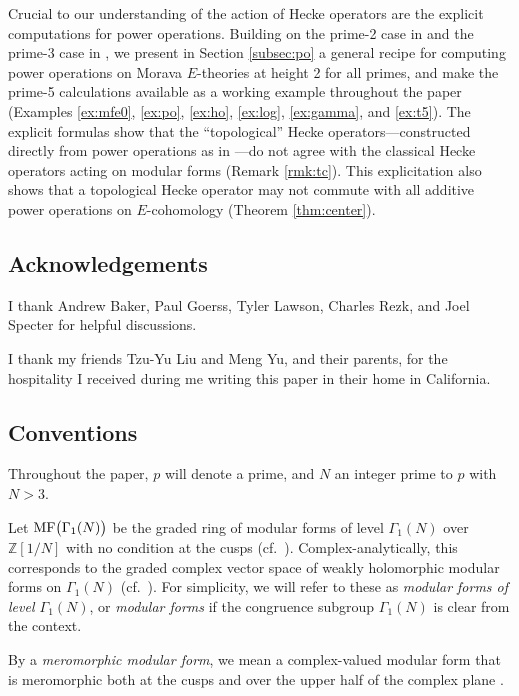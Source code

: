 \documentclass{gtpart}
\theoremstyle{definition}
\theoremstyle{remark}
\newcommand{\mb}[1]{\mathbb{#1}}
\newcommand{\BZ}{{\mb Z}}
\newcommand{\MF}{{\rm MF}}
\newcommand{\G}{\Gamma}
\renewcommand{\=}{\approx}
\renewcommand{\-}{\sim}
\numberwithin{equation}{section}
\numberwithin{thm}{section}
\begin{document}
Crucial to our understanding of the action of Hecke operators are the explicit 
computations for power operations.  Building on the prime-2 case in \cite{h2p2} 
and the prime-3 case in \cite{p3}, we present in Section \ref{subsec:po} a 
general recipe for computing power operations on Morava $E$-theories at height 2 
for all primes, and make the prime-5 calculations available as a working example 
throughout the paper (Examples \ref{ex:mfe0}, \ref{ex:po}, \ref{ex:ho}, 
\ref{ex:log}, \ref{ex:gamma}, and \ref{ex:t5}).  The explicit formulas show that 
the ``topological'' Hecke operators---constructed directly from power operations 
as in \cite[Proposition 3.6.2]{Ando95}---do not agree with the classical Hecke 
operators acting on modular forms (Remark \ref{rmk:tc}).  This explicitation 
also shows that a topological Hecke operator may not commute with all additive 
power operations on $E$-cohomology (Theorem \ref{thm:center}).  



\subsection{Acknowledgements}

I thank Andrew Baker, Paul Goerss, Tyler Lawson, Charles Rezk, and Joel Specter 
for helpful discussions.  

I thank my friends Tzu-Yu Liu and Meng Yu, and their parents, for the 
hospitality I received during me writing this paper in their home in California.  



\subsection{Conventions}

Throughout the paper, $p$ will denote a prime, and $N$ an integer prime to $p$ 
with $N > 3$.  

Let $\MF\big(\G_1(N)\big)$ be the graded ring of modular forms of level 
$\G_1(N)$ over $\BZ[1/N]$ with no condition at the cusps 
(cf.~\cite[Section 1.2]{padicprop}).  Complex-analytically, this corresponds to 
the graded complex vector space of weakly holomorphic modular forms on $\G_1(N)$ 
(cf.~\cite[Definition 1.12]{web}).  For simplicity, we will refer to these as 
{\em modular forms of level $\G_1(N)$}, or {\em modular forms} if the congruence 
subgroup $\G_1(N)$ is clear from the context.  

By a {\em meromorphic modular form}, we mean a complex-valued modular form that 
is meromorphic both at the cusps and over the upper half of the complex plane 
\cite[Definition 1.8]{web}.  
\end{document}
